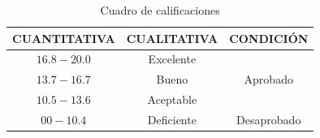 \begin{table}[!ht]
    \centering
    \begin{tabular}{| c | c | c |}
        \hline
        \rowcolor{gray!30}
        \textbf{CUANTITATIVA} & \textbf{CUALITATIVA} & \textbf{CONDICIÓN}        \\ \hline
        $16.8-20.0$           & Excelente            & \multirow{3}{*}{Aprobado} \\ \cline{1-2}
        $13.7-16.7$           & Bueno                &                           \\ \cline{1-2}
        $10.5-13.6$           & Aceptable            &                           \\ \hline
        $00-10.4$             & Deficiente           & Desaprobado               \\ \hline
    \end{tabular}
    \caption{Cuadro de calificaciones}
    \label{tab:calificaciones}
\end{table}